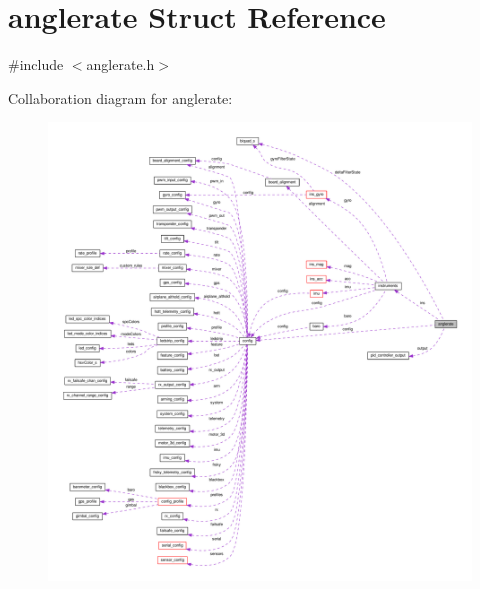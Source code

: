\hypertarget{structanglerate}{\section{anglerate Struct Reference}
\label{structanglerate}
}


{\ttfamily \#include $<$anglerate.\+h$>$}



Collaboration diagram for anglerate\+:\nopagebreak
\begin{figure}[H]
\begin{center}
\leavevmode
\includegraphics[width=350pt]{structanglerate__coll__graph}
\end{center}
\end{figure}
